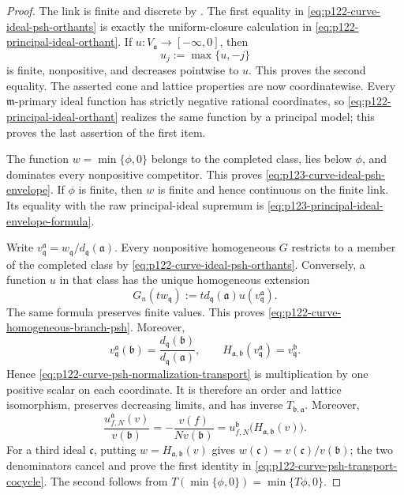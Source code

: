 \begin{proof}
The link is finite and discrete by
.  The first equality in
\eqref{eq:p122-curve-ideal-psh-orthants} is exactly the uniform-closure
calculation in
\eqref{eq:p122-principal-ideal-orthant}.  If
\(u:V_{\mathfrak a}\to[-\infty,0]\), then
\[
                            u_j:=\max\{u,-j\}
\]
is finite, nonpositive, and decreases pointwise to \(u\).  This proves the
second equality.  The asserted cone and lattice properties are now
coordinatewise.  Every \(\mathfrak m\)-primary ideal function has strictly
negative rational coordinates, so
\eqref{eq:p122-principal-ideal-orthant} realizes the same function by a
principal model; this proves the last assertion of the first item.

The function \(w=\min\{\phi,0\}\) belongs to the completed class, lies
below \(\phi\), and dominates every nonpositive competitor.  This proves
\eqref{eq:p123-curve-ideal-psh-envelope}.  If \(\phi\) is finite, then
\(w\) is finite and hence continuous on the finite link.  Its equality with
the raw principal-ideal supremum is
\eqref{eq:p123-principal-ideal-envelope-formula}.

Write
\(v_{\mathfrak q}^{\mathfrak a}
  =w_{\mathfrak q}/d_{\mathfrak q}(\mathfrak a)\).
Every nonpositive homogeneous \(G\) restricts to a member of the completed
class by \eqref{eq:p122-curve-ideal-psh-orthants}.  Conversely, a function
\(u\) in that class has the unique homogeneous extension
\[
 G_u(tw_{\mathfrak q})
    :=t d_{\mathfrak q}(\mathfrak a)
          u(v_{\mathfrak q}^{\mathfrak a}).
\]
The same formula preserves finite values.  This proves
\eqref{eq:p122-curve-homogeneous-branch-psh}.  Moreover,
\[
 v_{\mathfrak q}^{\mathfrak a}(\mathfrak b)
   =\frac{d_{\mathfrak q}(\mathfrak b)}
          {d_{\mathfrak q}(\mathfrak a)},
 \qquad
 H_{\mathfrak a,\mathfrak b}
       (v_{\mathfrak q}^{\mathfrak a})
   =v_{\mathfrak q}^{\mathfrak b}.
\]
Hence \eqref{eq:p122-curve-psh-normalization-transport} is multiplication
by one positive scalar on each coordinate.  It is therefore an order and
lattice isomorphism, preserves decreasing limits, and has inverse
\(T_{\mathfrak b,\mathfrak a}\).  Moreover,
\[
 \frac{u^{\mathfrak a}_{f,N}(v)}{v(\mathfrak b)}
   =-\frac{v(f)}{Nv(\mathfrak b)}
   =u^{\mathfrak b}_{f,N}
       \bigl(H_{\mathfrak a,\mathfrak b}(v)\bigr).
\]
For a third ideal \(\mathfrak c\), putting
\(w=H_{\mathfrak a,\mathfrak b}(v)\) gives
\(w(\mathfrak c)=v(\mathfrak c)/v(\mathfrak b)\); the two denominators
cancel and prove the first identity in
\eqref{eq:p122-curve-psh-transport-cocycle}.  The second follows from
\(T(\min\{\phi,0\})=\min\{T\phi,0\}\).


\end{proof}
